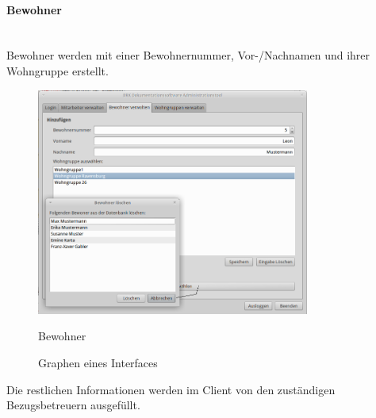 \paragraph{Bewohner}\mbox{}\\
Bewohner werden mit einer Bewohnernummer, Vor-/Nachnamen und ihrer Wohngruppe  erstellt. 
\begin{figure}[h]
	\begin{center}
		\includegraphics[keepaspectratio=true, width=0.8\textwidth]{pics/admin2.png}
		\caption{Bewohner}
		\label{Admindialog Bewohner}
		\caption{Graphen eines Interfaces}
		\label{Admindialog_Bewohner}
	\end{center}
\end{figure}
\FloatBarrier
\noindent
Die restlichen Informationen werden im Client von den zuständigen Bezugsbetreuern ausgefüllt.
\newpage
\noindent

